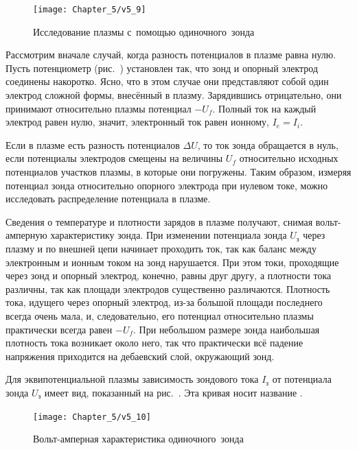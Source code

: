 \begin{figure}[h]
	\centering
	\texttt{[image: Chapter\_5/v5\_9]}
	\caption{Исследование плазмы с~помощью одиночного~зонда}
\end{figure}

Рассмотрим вначале случай, когда разность потенциалов в плазме равна нулю.
Пусть потенциометр (рис.~) установлен
так, что зонд и опорный электрод соединены накоротко.
Ясно, что в этом случае они представляют собой один электрод сложной формы,
внесённый в плазму. Зарядившись отрицательно, они принимают относительно
плазмы потенциал $-U_f$. Полный ток на каждый электрод равен нулю, значит,
электронный ток равен ионному, $I_e=I_i$.

Если в плазме есть разность потенциалов $\Delta U$,
то ток зонда обращается в нуль, если потенциалы электродов
смещены на величины $U_f$ относительно исходных потенциалов
участков плазмы, в которые они погружены.
Таким образом, измеряя потенциал зонда относительно опорного электрода при нулевом
токе, можно исследовать распределение потенциала в плазме.

Сведения о температуре и плотности зарядов в плазме получают, снимая
вольт-амперную характеристику зонда.
При изменении потенциала зонда $U_з$ через плазму и по внешней цепи
начинает проходить ток, так как баланс между электронным и ионным током на зонд
нарушается. При этом токи, проходящие через зонд и опорный электрод, конечно,
равны друг другу, а плотности тока различны, так как площади
электродов существенно различаются.
Плотность тока, идущего через опорный электрод, из-за большой площади последнего
всегда очень мала, и, следовательно, его потенциал относительно плазмы
практически всегда равен $-U_f$. При небольшом размере зонда наибольшая
плотность тока возникает около него, так что практически всё падение напряжения
приходится на дебаевский слой, окружающий зонд.

Для эквипотенциальной плазмы зависимость зондового тока $I_\text{з}$
от потенциала зонда $U_\text{з}$ имеет вид, показанный на рис.~.
Эта кривая носит название .

\begin{figure}[h]
    \centering\texttt{[image: Chapter\_5/v5\_10]}
    \caption{Вольт-амперная характеристика одиночного~зонда}
\end{figure}

